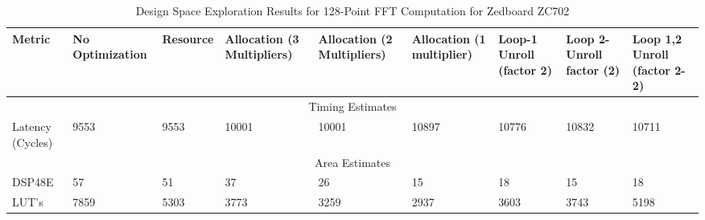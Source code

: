 \begin{table}[H]
\centering
\caption{Design Space Exploration Results for 128-Point FFT Computation for Zedboard ZC702}
\label{128-point}
\begin{tabular}{||m{1.5cm}|m{1.5cm}|m{1.5cm}|m{1.6cm}|m{1.6cm}|m{1.6cm}|m{1.4cm}|m{1.4cm}|m{1.4cm}||}
\hline
Metric & No Optimization & Resource & Allocation (3 Multipliers) & Allocation (2 Multipliers) & Allocation (1 multiplier) & Loop-1 Unroll (factor 2) & Loop 2-Unroll factor (2) & Loop 1,2 Unroll (factor 2-2) \\
\hline
\multicolumn{9}{||c||}{Timing Estimates}\\
\hline
Latency (Cycles) & 9553 & 9553 & 10001 &10001 & 10897 & 10776 &  10832 & 10711\\
\hline
\multicolumn{9}{||c||}{Area Estimates}\\
\hline
DSP48E  & 57 & 51 & 37 & 26 & 15 & 18 & 15 & 18\\
\hline
LUT's  &  7859 & 5303 & 3773 & 3259 & 2937 & 3603 & 3743 & 5198\\

\hline
\end{tabular}

\end{table}